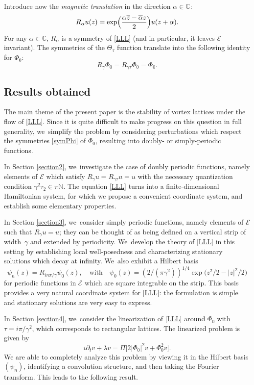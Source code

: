 \documentclass[10pt]{amsart}
\theoremstyle{definition}
\let\EE\exp
\let\ov\overline
\newcommand\C{\mathbb C}
\begin{document}
Introduce now the \textit{magnetic translation} in the direction $\alpha \in \mathbb{C}$:
\[
R_\alpha u (z) = \EE\Bigl(\frac{\alpha \ov{z} - \ov{\alpha} z}2\Bigr) u(z+\alpha).
\]
For any $\alpha\in \C$, $R_\alpha$ is a symmetry of \eqref{LLL} (and in particular, it leaves $\mathcal{E}$ invariant). The symmetries of the $\Theta_{\tau}$ function translate into the following identity for $\Phi_0$:
\begin{equation}
\label{symPhi}
R_{\gamma} \Phi_0 = R_{\gamma \tau} \Phi_0 = \Phi_0.
\end{equation}

\subsection{Results obtained}
The main theme of the present paper is the stability of vortex lattices under the flow of \eqref{LLL}. Since it is quite difficult to make progress on this question in full generality, we~simplify the problem by considering perturbations which respect the symmetries \eqref{symPhi} of $\Phi_0$, resulting into doubly- or simply-periodic functions.

In Section \ref{section2}, we~investigate the case of doubly periodic functions, namely elements of $\mathcal{E}$ which satisfy $R_\gamma u = R_{\gamma \tau} u = u$ with the necessary quantization condition $\gamma^2 \tau_2 \in \pi \mathbb{N}$. The equation \eqref{LLL} turns into a finite-dimensional Hamiltonian system, for which we propose a convenient coordinate system, and establish some elementary properties.

In Section \ref{section3}, we~consider simply periodic functions, namely elements of $\mathcal{E}$ such that $R_\gamma u = u$; they can be thought of as being defined on a vertical strip of width~$\gamma$ and extended by periodicity. We~develop the theory of \eqref{LLL} in this setting by establishing local well-posedness and characterizing stationary solutions which decay at infinity. We~also exhibit a Hilbert basis
\[
\psi_n(z) = R_{{in\pi}/{\gamma}} \psi_0 (z), \quad \text{with} \quad \psi_0(z) = \left({2}/({\pi \gamma^2}) \right)^{1/4} \EE\bigl(z^2/2 - |z|^2/2 \bigr)
\]
for periodic functions in $\mathcal{E}$ which are square integrable on the strip. This basis provides a very natural coordinate system for \eqref{LLL}: the formulation is simple and stationary solutions are very easy to express.

In Section \ref{section4}, we~consider the linearization of \eqref{LLL} around $\Phi_0$ with $\tau = {i \pi}/{\gamma^2}$, which corresponds to rectangular lattices. The linearized problem is given by
\begin{equation}
\label{linearizedpb}
i \partial_t v + \lambda v = \Pi \big[2 |\Phi_0|^2 v + \Phi_0^2 \overline{v}\big].
\end{equation}
We are able to completely analyze this problem by viewing it in the Hilbert basis $(\psi_n)$, identifying a convolution structure, and then taking the Fourier transform. This leads to the following result.
\end{document}
